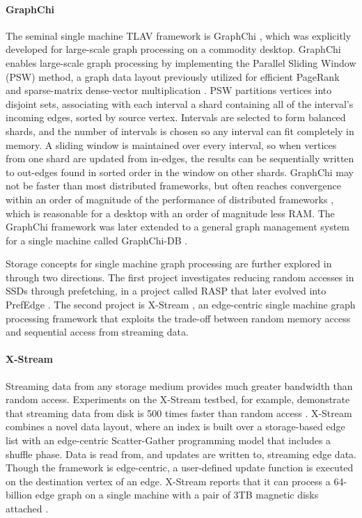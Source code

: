 \documentclass[reprint,twocolumn,showpacs,preprintnumbers,amsmath, aps,pre,amssymb]{revtex4-1}
\begin{document}
\paragraph*{GraphChi} The seminal single machine TLAV framework is GraphChi \cite{Kyrola2012}, which was explicitly developed for large-scale graph processing on a commodity desktop.  GraphChi enables large-scale graph processing by implementing the Parallel Sliding Window (PSW) method, a graph data layout previously utilized for efficient PageRank and sparse-matrix dense-vector multiplication \cite{Chen2002,Bender2010}.  PSW partitions vertices into disjoint sets, associating with each interval a shard containing all of the interval's incoming edges, sorted by source vertex.  Intervals are selected to form balanced shards, and the number of intervals is chosen so any interval can fit completely in memory.  A sliding window is maintained over every interval, so when vertices from one shard are updated from in-edges,  the results can be sequentially written to out-edges found in sorted order in the window on other shards.  GraphChi may not be faster than most distributed frameworks, but often reaches convergence within an order of magnitude of the performance of distributed frameworks \cite{Kyrola2012}, which is reasonable for a desktop with an order of magnitude less RAM.  The GraphChi framework was later extended to a general graph management system for a single machine called GraphChi-DB \cite{Kyrola2014}.

Storage concepts for single machine graph processing are further explored in \cite{Yoneki2013} through two directions.  The first project investigates reducing random accesses in SSDs through prefetching, in a project called RASP that later evolved into PrefEdge \cite{Nilakant2014}.  The second project is X-Stream \cite{Roy2013}, an edge-centric single machine graph processing framework that exploits the trade-off between random memory access and sequential access from streaming data.

\paragraph*{X-Stream} Streaming data from any storage medium provides much greater bandwidth than random access.  Experiments on the X-Stream testbed, for example, demonstrate that streaming data from disk is 500 times faster than random access \cite{Roy2013}. X-Stream combines a novel data layout, where an index is built over a storage-based edge list with an edge-centric Scatter-Gather programming model that includes a shuffle phase. Data is read from, and updates are written to, streaming edge data.  Though the framework is edge-centric, a user-defined update function is executed on the destination vertex of an edge.  X-Stream reports that it can process a 64-billion edge graph on a single machine with a pair of 3TB magnetic disks attached \cite{xstreamweb}.
\end{document}
